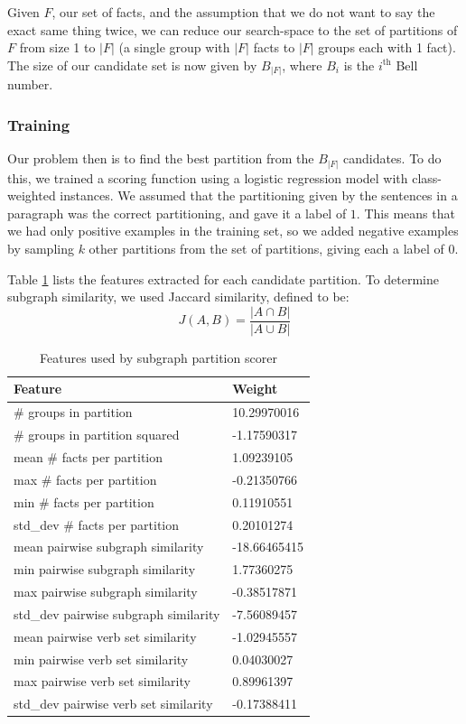 \documentclass[12pt]{article}
\begin{document}
Given $F$, our set of facts, and the assumption that we do not want to say the exact same thing twice, we can reduce our search-space to the set of partitions of $F$ from size 1 to $|F|$ (a single group with $|F|$ facts to $|F|$ groups each with 1 fact). The size of our candidate set is now given by $B_{|F|}$, where $B_i$ is the $i^{\text{th}}$ Bell number.

\subsubsection{Training}
Our problem then is to find the best partition from the $B_{|F|}$ candidates. To do this, we trained a scoring function using a logistic regression model with class-weighted instances. We assumed that the partitioning given by the sentences in a paragraph was the correct partitioning, and gave it a label of $1$. This means that we had only positive examples in the training set, so we added negative examples by sampling $k$ other partitions from the set of partitions, giving each a label of $0$.

Table \ref{tab:subgraph_selection_features} lists the features extracted for each candidate partition. To determine subgraph similarity, we used
Jaccard similarity, defined to be:
$$J(A,B) = \frac{\lvert A \cap B \rvert}{\lvert A \cup B \rvert}$$

\begin{table}[H]
\centering
\caption{Features used by subgraph partition scorer}
\label{tab:subgraph_selection_features}
\begin{tabular}{@{}ll@{}}
\toprule
\textbf{Feature}                      & \textbf{Weight} \\ \midrule
\# groups in partition                & 10.29970016     \\
\# groups in partition squared        & -1.17590317     \\
mean \# facts per partition           & 1.09239105      \\
max \# facts per partition            & -0.21350766     \\
min \# facts per partition            & 0.11910551      \\
std\_dev \# facts per partition       & 0.20101274      \\
mean pairwise subgraph similarity     & -18.66465415    \\
min pairwise subgraph similarity      & 1.77360275      \\
max pairwise subgraph similarity      & -0.38517871     \\
std\_dev pairwise subgraph similarity & -7.56089457     \\
mean pairwise verb set similarity     & -1.02945557     \\
min pairwise verb set similarity      & 0.04030027      \\
max pairwise verb set similarity      & 0.89961397      \\
std\_dev pairwise verb set similarity & -0.17388411     \\ \bottomrule
\end{tabular}
\end{table}
\end{document}

